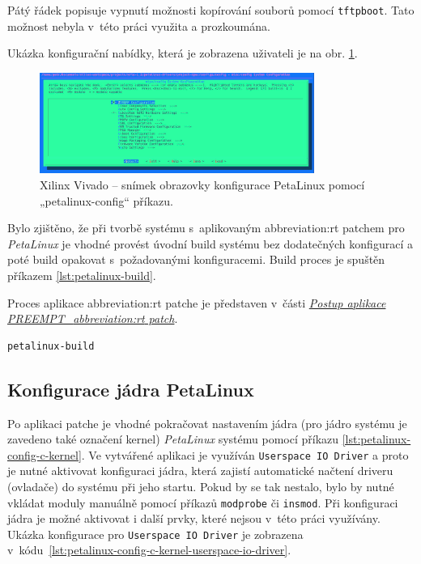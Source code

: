 \documentclass[a4paper, twoside, 11pt]{article}
\begin{document}
	Pátý řádek popisuje vypnutí možnosti kopírování souborů pomocí \texttt{tftpboot}. Tato možnost nebyla v~této práci využita a prozkoumána.\par
	Ukázka konfigurační nabídky, která je zobrazena uživateli je na obr. \ref{fig:terminal-petalinux-config}.\par

\begin{figure}[htbp!]
	\centering
	\includegraphics[width=0.80\textwidth]{src/jpg/terminal-petalinux-config-crop.jpg}
	\caption{Xilinx Vivado – snímek obrazovky konfigurace PetaLinux pomocí „petalinux-config“ příkazu.}
	\label{fig:terminal-petalinux-config}
\end{figure}


	Bylo zjištěno, že při tvorbě systému s~aplikovaným \gls{abbreviation:rt} patchem pro \textit{PetaLinux} je vhodné provést úvodní build systému bez dodatečných konfigurací a poté build opakovat s~požadovanými konfiguracemi. Build proces je spuštěn příkazem \ref{lst:petalinux-build}.\par
	Proces aplikace \gls{abbreviation:rt} patche je představen v~části \hyperref[subsubsec:postup-aplikace-preempt-rt-patch]{\textit{Postup aplikace PREEMPT\_\gls{abbreviation:rt} patch}}.\par

\begin{lstlisting}[language={sh}, caption={PetaLinux build příkaz pro vytvoření systému.}, label= {lst:petalinux-build}, morekeywords={petalinux-build, petalinux-package, petalinux-config}]
petalinux-build\end{lstlisting}

	\subsection{Konfigurace jádra PetaLinux}
	Po aplikaci patche je vhodné pokračovat nastavením jádra (pro jádro systému je zavedeno také označení kernel) \textit{PetaLinux} systému pomocí příkazu \ref{lst:petalinux-config-c-kernel}. Ve vytvářené aplikaci je využíván \texttt{Userspace IO Driver} a proto je nutné aktivovat konfiguraci jádra, která zajistí automatické načtení driveru (ovladače) do systému při jeho startu. Pokud by se tak nestalo, bylo by nutné vkládat moduly manuálně pomocí příkazů \texttt{modprobe} či \texttt{insmod}. Při konfiguraci jádra je možné aktivovat i další prvky, které nejsou v~této práci využívány. Ukázka konfigurace pro \texttt{Userspace IO Driver} je zobrazena v~kódu~\ref{lst:petalinux-config-c-kernel-userspace-io-driver}.\par
\end{document}
